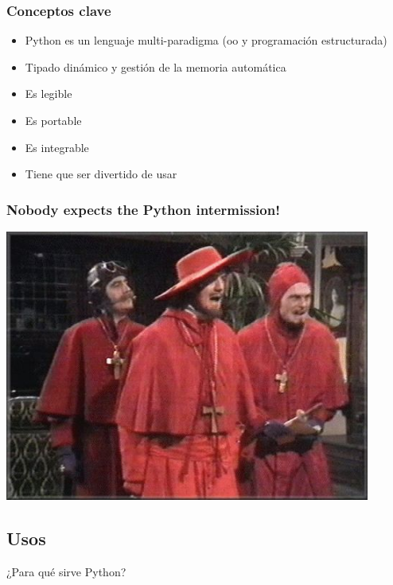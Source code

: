 \documentclass{beamer}
\begin{document}

\begin{frame}
\frametitle{Conceptos clave}
\begin{itemize}
\item Python es un lenguaje multi-paradigma (oo y programación estructurada)
\item Tipado dinámico y gestión de la memoria automática
\item Es legible
\item Es portable
\item Es integrable
\item Tiene que ser divertido de usar
\end{itemize}
\end{frame}

\begin{frame}
\frametitle{Nobody expects the Python intermission!}
\includegraphics[width=0.9\textwidth]{monty.jpg}
\end{frame}

\subsection{Usos}

\begin{frame}
¿Para qué sirve Python?
\end{frame}
\end{document}
